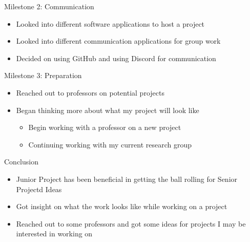 \documentclass[10pt]{beamer}
\begin{document}
\begin{frame}[fragile]{Milestone 2: Communication}
  \begin{itemize}
    \item Looked into different software applications to host a project
    \item Looked into different communication applications for group work
    \item Decided on using GitHub and using Discord for communication
  \end{itemize}
\end{frame}

\begin{frame}[fragile]{Milestone 3: Preparation}
  \begin{itemize}
    \item Reached out to professors on potential projects
    \item Began thinking more about what my project will look like
      \begin{itemize}
        \item Begin working with a professor on a new project
        \item Continuing working with my current research group
      \end{itemize}
  \end{itemize}
\end{frame}

\begin{frame}[fragile]{Conclusion}
  \begin{itemize}
    \item Junior Project has been beneficial in getting the ball rolling for Senior Projectd Ideas
    \item Got insight on what the work looks like while working on a project
    \item Reached out to some professors and got some ideas for projects I may be interested in working on
  \end{itemize}
\end{frame}
\end{document}
